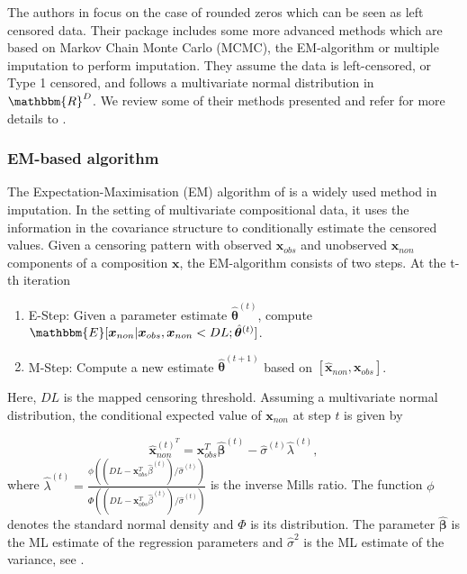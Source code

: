 The authors in \textcite{Palarea-Albaladejo:2015} focus on the case of rounded zeros which can be seen as left censored data. Their package includes some more advanced methods which are based on Markov Chain Monte Carlo (MCMC), the EM-algorithm or multiple imputation to perform imputation. They assume the data is left-censored, or Type 1 censored, and follows a multivariate normal distribution in $\mathbbm{R}^D$. We review some of their methods presented and refer for more details to \textcite{Palarea-Albaladejo:2015}.

\subsubsection{EM-based algorithm}
\label{sec:EM-algorithm}

The Expectation-Maximisation (EM) algorithm of \textcite{Dempster:1977} is a widely used method in imputation. In the setting of multivariate compositional data, it uses the information in the covariance structure to conditionally estimate the censored values. Given a censoring pattern with observed $\bm{x}_{obs}$ and unobserved $\bm{x}_{non}$ components of a composition $\bm{x}$, the EM-algorithm consists of two steps. At the t-th iteration

\begin{enumerate}
	\item E-Step: Given a parameter estimate $\hat{\bm{\theta}}^{(t)}$, compute $\mathbbm{E}[\bm{x}_{non}|\bm{x}_{obs},\bm{x}_{non} < DL; \hat{\bm{\theta}}^{(t)}]$.
	\item M-Step: Compute a new estimate $\hat{\bm{\theta}}^{(t+1)}$ based on $[\hat{\bm{x}}_{non},\bm{x}_{obs}]$.
\end{enumerate}
%
Here, $DL$ is the mapped censoring threshold. Assuming a multivariate normal distribution, the conditional expected value of $\bm{x}_{non}$ at step $t$ is given by

\begin{equation}
\hat{\bm{x}}_{non}^{(t)^T} = \bm{x}_{obs}^T\hat{\bm{\beta}}^{(t)} - \hat{\sigma}^{(t)}\hat{\lambda}^{(t)},
\label{eq:E-step}
\end{equation}
%
where $\hat{\lambda}^{(t)}=\frac{\phi((DL-\bm{x}_{obs}^T\hat{\beta}^{(t)})/\hat{\sigma}^{(t)})}{\Phi((DL-\bm{x}_{obs}^T\hat{\beta}^{(t)})/\hat{\sigma}^{(t)})}$ is the inverse Mills ratio. The function $\phi$ denotes the standard normal density and $\Phi$ is its distribution. The parameter $\hat{\bm{\beta}}$ is the ML estimate of the regression parameters and $\hat{\sigma}^2$ is the ML estimate of the variance, see \textcite{Palarea-Albaladejo:2015}. %

